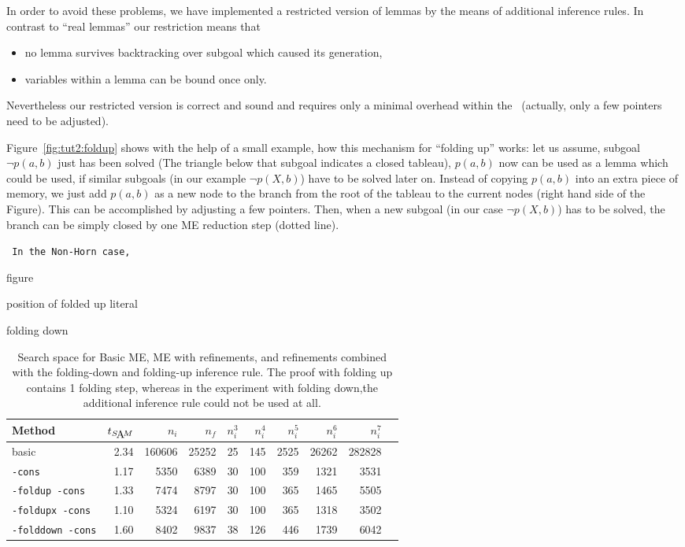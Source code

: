 In order to avoid these problems, we have implemented a restricted
version of lemmas by the means of additional inference rules.
In contrast to ``real lemmas'' our restriction means that
\begin{itemize}
\item
	no lemma survives backtracking over subgoal which caused its
	generation,
\item
	variables within a lemma can be bound once only.
\end{itemize}
Nevertheless our restricted version is correct and sound and requires
only a minimal overhead within the \SAM\  (actually, only a few pointers
need to be adjusted).

Figure~\ref{fig:tut2:foldup} shows with the help of a small example,
how this mechanism for ``folding up'' works: let us assume, subgoal
$\neg p(a,b)$ just has been solved (The triangle below that subgoal
indicates a closed tableau), $p(a,b)$ now can be used as a lemma
which could be used, if similar subgoals (in our example $\neg p(X,b)$)
have to be solved later on. 
Instead of copying $p(a,b)$ into an extra piece of memory, we just
add $p(a,b)$ as a new node to the branch from the root of the
tableau to the current nodes (right hand side of the Figure). This
can be accomplished by adjusting a few pointers. Then, when a new subgoal
(in our case $\neg p(X,b)$) has to be solved, the branch can be simply
closed by one ME reduction step (dotted line). 

{\tt
In the Non-Horn case, 

figure

position of folded up literal

folding down
}

\begin{table}[htb]
\begin{center}
\begin{tabular}{|l|r|r|r||r|r|r|r|r|r|}
\hline
Method & $t_{\SAM}$ & $n_i$ & $n_f$ & 
	$n_i^3$ & $n_i^4$ & $n_i^5$ & $n_i^6$ & $n_i^7$ \\
\hline\hline
basic & 2.34 & 160606 & 25252 &
	25 & 145 & 2525 & 26262 & 282828 \\
\hline
{\tt -cons} & 1.17 & 5350 & 6389 &
	30 & 100 & 359 & 1321 & 3531 \\
\hline
{\tt -foldup -cons} & 1.33 & 7474 & 8797 &
	30 & 100 & 365 & 1465 & 5505 \\
\hline
{\tt -foldupx -cons} & 1.10 & 5324 & 6197 &
	30 & 100 & 365 & 1318 & 3502 \\
\hline
{\tt -folddown -cons} & 1.60 & 8402 & 9837 &
	38 & 126 & 446 & 1739 & 6042 \\
\hline\hline
\end{tabular}
\end{center}
\caption{Search space for Basic ME, ME with refinements, and refinements
combined with the folding-down and folding-up inference rule. The proof with
folding up contains 1 folding step, whereas in the experiment with folding down,the additional inference rule could not be used at all.}
\label{tab:tut2:results.fold}
\end{table}

